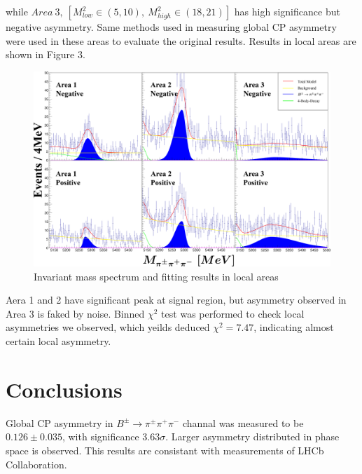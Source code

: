 \documentclass[12pt, twoside, notitlepage, twocolumn]{article}
\begin{document}
        while $Area\ 3,\ [M^2_{low} \in (5,10),\ M^2_{high}\in(18,21)]$ has high significance but negative 
        asymmetry. Same methods used in measuring global CP asymmetry were used in these areas to evaluate 
        the original results. Results in local areas are shown in Figure 3.
        \begin{figure}[!ht]
            \begin{centering}
            \includegraphics[scale=0.185]{ZoomFinal.png}
            \caption{Invariant mass spectrum and fitting results in local areas}
            \end{centering}
            \label{fig:label3}
        \end{figure}
        Aera 1 and 2 have significant peak at signal region, but asymmetry observed in Area 3 is faked by noise. Binned $\chi^2$
        test\cite{Parkes:2016yie} was performed to check local asymmetries we observed, which yeilds deduced $\chi^2=7.47$, 
        indicating almost certain local asymmetry. 
        \section{Conclusions}
        Global CP asymmetry in $B^{\pm}\rightarrow\pi^{\pm}\pi^{+}\pi^{-}$ channal was measured to be $0.126\pm0.035$, with significance
        $3.63\sigma$. Larger asymmetry distributed in phase space is observed. This results are consistant with measurements of LHCb Collaboration.
        \cite{1310.4740}
        
        
    
\end{document}

